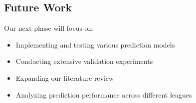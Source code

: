 \documentclass[conference]{IEEEtran}
\begin{document}
\subsection{Future Work}
Our next phase will focus on:
\begin{itemize}
\item Implementing and testing various prediction models
\item Conducting extensive validation experiments
\item Expanding our literature review
\item Analyzing prediction performance across different leagues
\end{itemize}
\end{document}
